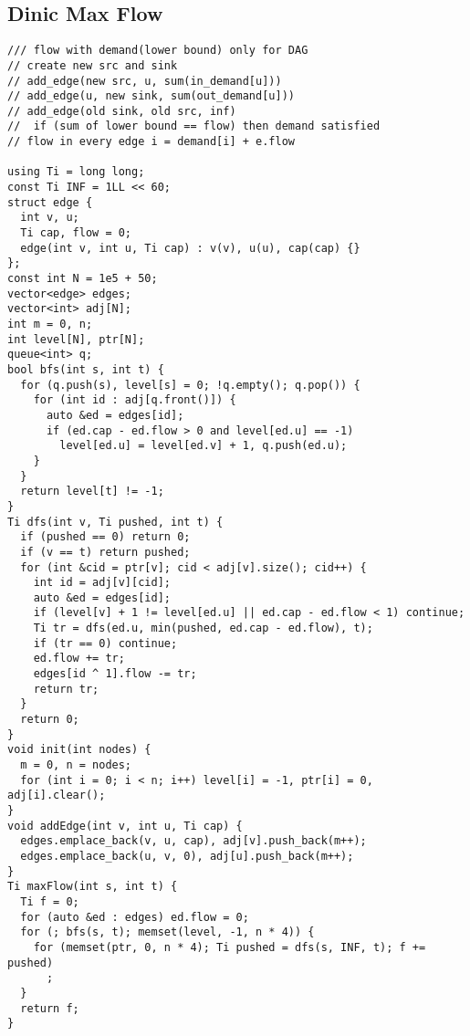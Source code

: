 \documentclass[FSZ,a4paper,onesided]{article}
\begin{document}
\begin{multicols*}{\COLS}
\subsection{Dinic Max Flow}
\begin{lstlisting}
/// flow with demand(lower bound) only for DAG
// create new src and sink
// add_edge(new src, u, sum(in_demand[u]))
// add_edge(u, new sink, sum(out_demand[u]))
// add_edge(old sink, old src, inf)
//  if (sum of lower bound == flow) then demand satisfied
// flow in every edge i = demand[i] + e.flow

using Ti = long long;
const Ti INF = 1LL << 60;
struct edge {
  int v, u;
  Ti cap, flow = 0;
  edge(int v, int u, Ti cap) : v(v), u(u), cap(cap) {}
};
const int N = 1e5 + 50;
vector<edge> edges;
vector<int> adj[N];
int m = 0, n;
int level[N], ptr[N];
queue<int> q;
bool bfs(int s, int t) {
  for (q.push(s), level[s] = 0; !q.empty(); q.pop()) {
    for (int id : adj[q.front()]) {
      auto &ed = edges[id];
      if (ed.cap - ed.flow > 0 and level[ed.u] == -1)
        level[ed.u] = level[ed.v] + 1, q.push(ed.u);
    }
  }
  return level[t] != -1;
}
Ti dfs(int v, Ti pushed, int t) {
  if (pushed == 0) return 0;
  if (v == t) return pushed;
  for (int &cid = ptr[v]; cid < adj[v].size(); cid++) {
    int id = adj[v][cid];
    auto &ed = edges[id];
    if (level[v] + 1 != level[ed.u] || ed.cap - ed.flow < 1) continue;
    Ti tr = dfs(ed.u, min(pushed, ed.cap - ed.flow), t);
    if (tr == 0) continue;
    ed.flow += tr;
    edges[id ^ 1].flow -= tr;
    return tr;
  }
  return 0;
}
void init(int nodes) {
  m = 0, n = nodes;
  for (int i = 0; i < n; i++) level[i] = -1, ptr[i] = 0, adj[i].clear();
}
void addEdge(int v, int u, Ti cap) {
  edges.emplace_back(v, u, cap), adj[v].push_back(m++);
  edges.emplace_back(u, v, 0), adj[u].push_back(m++);
}
Ti maxFlow(int s, int t) {
  Ti f = 0;
  for (auto &ed : edges) ed.flow = 0;
  for (; bfs(s, t); memset(level, -1, n * 4)) {
    for (memset(ptr, 0, n * 4); Ti pushed = dfs(s, INF, t); f += pushed)
      ;
  }
  return f;
}
\end{lstlisting}

\end{multicols*}
\end{document}
